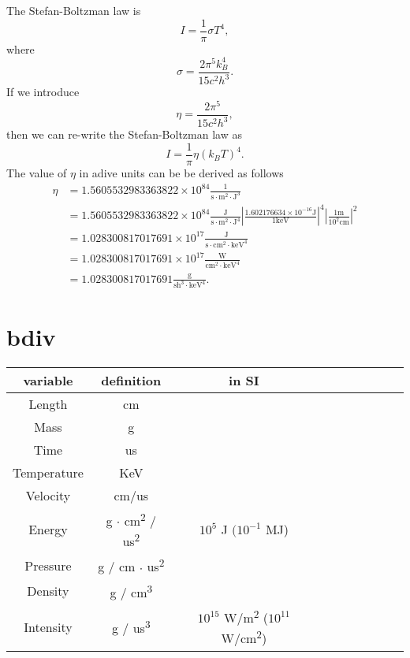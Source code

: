 \documentclass[11pt]{article}
\begin{document}
The Stefan-Boltzman law is
\begin{equation}
    I = \frac{1}{\pi} \sigma T^4,
\end{equation} 
where 
\begin{equation}
    \sigma = \frac{2 \pi^5 k_B^4 }{15 c^2 h^3}.
\end{equation}
If we introduce 
\begin{equation}
    \eta = \frac{2 \pi^5 }{15 c^2 h^3},
\end{equation}
then we can re-write the Stefan-Boltzman law as
\begin{equation}
    I = \frac{1}{\pi} \eta (k_B T)^4.
\end{equation}
The value of $\eta$ in adive units can be be derived as follows
\begin{align}
    \eta &= 1.5605532983363822 \times 10^{84} \frac{1}{\text{s} \cdot \text{m}^2 \cdot \text{J}^3} \nonumber \\
    &= 1.5605532983363822 \times 10^{84} \frac{\text{J}}{\text{s} \cdot \text{m}^2 \cdot \text{J}^4} \left | \frac{1.602176634 \times 10^{-16} \text{J}}{1\text{keV}} \right |^4 \left | \frac{1\text{m}}{10^2 \text{cm}} \right |^2 \nonumber \\
    &= 1.028300817017691 \times 10^{17} \frac{\text{J}}{\text{s} \cdot \text{cm}^2 \cdot \text{keV}^4} \nonumber \\
    &= 1.028300817017691 \times 10^{17} \frac{\text{W}}{\text{cm}^2 \cdot \text{keV}^4} \nonumber \\
    &= 1.028300817017691 \frac{\text{g}}{\text{sh}^3 \cdot \text{keV}^4}.
\end{align}

\section{bdiv}

\begin{center}
    \begin{tabular}{|Sc|Sc|Sc|Sc|Sc|}
        \hline
        variable & definition & in SI \\
        \hline 
        Length & cm & \\
        \hline
        Mass & g & \\
        \hline
        Time & us & \\
        \hline
        Temperature & KeV & \\
        \hline
        Velocity & cm/us & \\
        \hline
        Energy & g \( \cdot \) cm\textsuperscript{2} / us\textsuperscript{2} & $10^5$ J  $(10^{-1}$ MJ)\\
        \hline 
        Pressure & g / cm \( \cdot \) us\textsuperscript{2} & \\
        \hline
        Density & g / cm\textsuperscript{3} & \\
        \hline 
        Intensity & g / us\textsuperscript{3} & $10^{15}$ W/m\textsuperscript{2} ($10^{11}$ W/cm\textsuperscript{2})\\
        \hline
    \end{tabular}
\end{center}
\end{document}
